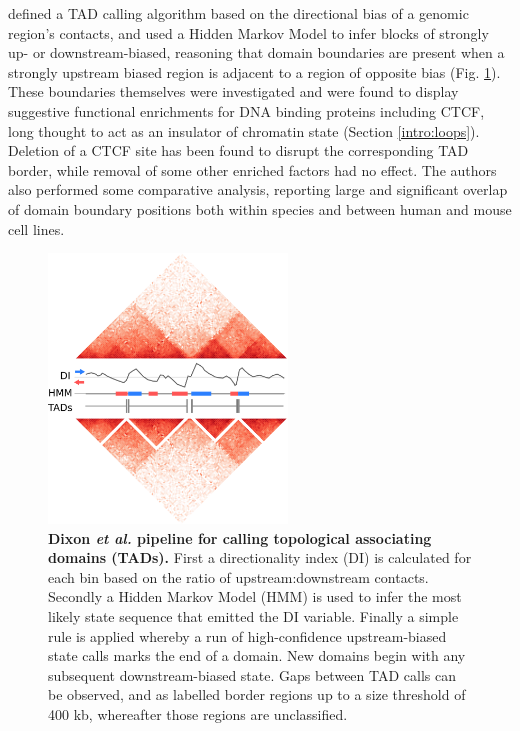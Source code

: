 \documentclass[a4paper,11pt,oneside]{book}
\begin{document}
\citet{Dixon2012} defined a TAD calling algorithm based on the directional bias of a genomic region's contacts, and used a Hidden Markov Model to infer blocks of strongly up- or downstream-biased, reasoning that domain boundaries are present when a strongly upstream biased region is adjacent to a region of opposite bias (Fig. \ref{fig:dicalc}). These boundaries themselves were investigated and were found to display suggestive functional enrichments for DNA binding proteins including CTCF, long thought to act as an insulator of chromatin state (Section \ref{intro:loops}). Deletion of a  CTCF site has been found to disrupt the corresponding TAD border, while removal of some other enriched factors had no effect.\cite{Nora2012, Narendra2015}
The authors also performed some comparative analysis, reporting large and significant overlap of domain boundary positions both within species and between human and mouse cell lines.\cite{Dixon2012}

\begin{figure}
\begin{center}
\includegraphics[width=2.5in]{figs/di_example.png}
\captionsetup{width=\textwidth}
\caption[Dixon \emph{et al.} pipeline for calling topological associating domains (TADs).]{ {\bf Dixon \emph{et al.} pipeline for calling topological associating domains (TADs).} First a directionality index (DI) is calculated for each bin based on the ratio of upstream:downstream contacts. Secondly a Hidden Markov Model (HMM) is used to infer the most likely state sequence that emitted the DI variable. Finally a simple rule is applied whereby a run of high-confidence upstream-biased state calls marks the end of a domain. New domains begin with any subsequent downstream-biased state. Gaps between TAD calls can be observed, and as labelled border regions up to a size threshold of 400 kb, whereafter those regions are unclassified.\cite{Dixon2012}
}\label{fig:dicalc}
\end{center}
\end{figure} 
\end{document}
